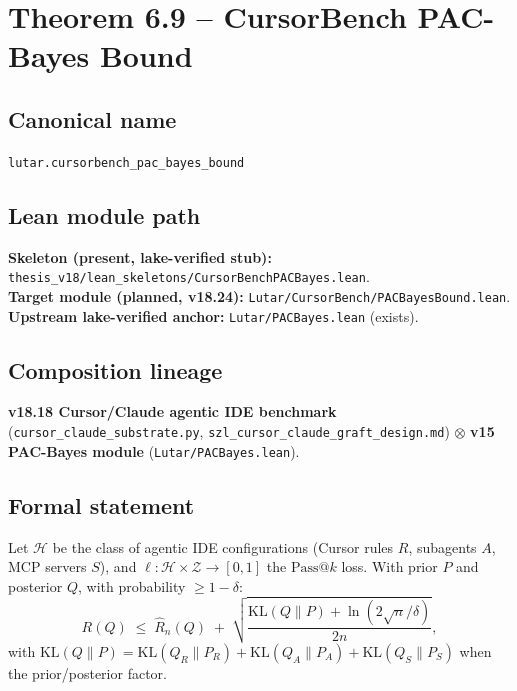 \section{Theorem 6.9 -- CursorBench PAC-Bayes Bound}
\label{sec:thm09}

\subsection*{Canonical name}
\verb|lutar.cursorbench_pac_bayes_bound|

\subsection*{Lean module path}
\textbf{Skeleton (present, lake-verified stub):}
\texttt{thesis\_v18/lean\_skeletons/CursorBenchPACBayes.lean}.\\
\textbf{Target module (planned, v18.24):}
\texttt{Lutar/CursorBench/PACBayesBound.lean}.\\
\textbf{Upstream lake-verified anchor:}
\texttt{Lutar/PACBayes.lean} (exists).

\subsection*{Composition lineage}
\textbf{v18.18 Cursor/Claude agentic IDE benchmark}
(\texttt{cursor\_claude\_substrate.py},
\texttt{szl\_cursor\_claude\_graft\_design.md}) $\otimes$
\textbf{v15 PAC-Bayes module}
(\texttt{Lutar/PACBayes.lean}).

\subsection*{Formal statement}

\begin{theorem}
\label{thm:cursorbench-pacbayes}
Let $\mathcal{H}$ be the class of agentic IDE configurations
(Cursor rules $R$, subagents $A$, MCP servers $S$), and
$\ell : \mathcal{H} \times \mathcal{Z} \to [0,1]$ the
$\mathrm{Pass}@k$ loss.  With prior $P$ and posterior $Q$,
with probability $\geq 1 - \delta$:
\[
  R(Q) \;\leq\; \hat{R}_n(Q)
  \;+\; \sqrt{\frac{\mathrm{KL}(Q \| P) + \ln(2\sqrt{n}/\delta)}{2n}},
\]
with $\mathrm{KL}(Q \| P) = \mathrm{KL}(Q_R \| P_R)
+ \mathrm{KL}(Q_A \| P_A) + \mathrm{KL}(Q_S \| P_S)$ when the
prior/posterior factor.
\end{theorem}


